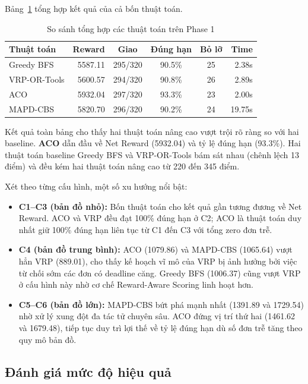 \documentclass[conference]{IEEEtran}
\begin{document}
Bảng~\ref{tab:compare-all} tổng hợp kết quả của cả bốn thuật toán.

\begin{table}[htbp]
\caption{So sánh tổng hợp các thuật toán trên Phase 1}
\label{tab:compare-all}
\centering
\footnotesize
\begin{tabular}{|l|r|c|c|c|r|}
\hline
\textbf{Thuật toán} & \textbf{Reward} & \textbf{Giao} & \textbf{Đúng hạn} & \textbf{Bỏ lỡ} & \textbf{Time} \\
\hline
Greedy BFS   & 5587.11 & 295/320 & 90.5\% & 25 &  2.38s \\
VRP-OR-Tools & 5600.57 & 294/320 & 90.8\% & 26 &  2.89s \\
ACO          & 5932.04 & 297/320 & 93.3\% & 23 &  2.00s \\
MAPD-CBS     & 5820.70 & 296/320 & 90.2\% & 24 & 19.75s \\
\hline
\end{tabular}
\end{table}

Kết quả toàn bảng cho thấy hai thuật toán nâng cao vượt trội rõ ràng so với hai baseline. \textbf{ACO} dẫn đầu về Net Reward (5932.04) và tỷ lệ đúng hạn (93.3\%). Hai thuật toán baseline Greedy BFS và VRP-OR-Tools bám sát nhau (chênh lệch 13 điểm) và đều kém hai thuật toán nâng cao từ 220 đến 345 điểm.

Xét theo từng cấu hình, một số xu hướng nổi bật:
\begin{itemize}
    \item \textbf{C1--C3 (bản đồ nhỏ):} Bốn thuật toán cho kết quả gần tương đương về Net Reward. ACO và VRP đều đạt 100\% đúng hạn ở C2; ACO là thuật toán duy nhất giữ 100\% đúng hạn liên tục từ C1 đến C3 với tổng zero đơn trễ.
    \item \textbf{C4 (bản đồ trung bình):} ACO (1079.86) và MAPD-CBS (1065.64) vượt hẳn VRP (889.01), cho thấy kế hoạch vĩ mô của VRP bị ảnh hưởng bởi việc từ chối sớm các đơn có deadline căng. Greedy BFS (1006.37) cũng vượt VRP ở cấu hình này nhờ cơ chế Reward-Aware Scoring linh hoạt hơn.
    \item \textbf{C5--C6 (bản đồ lớn):} MAPD-CBS bứt phá mạnh nhất (1391.89 và 1729.54) nhờ xử lý xung đột đa tác tử chuyên sâu. ACO đứng vị trí thứ hai (1461.62 và 1679.48), tiếp tục duy trì lợi thế về tỷ lệ đúng hạn dù số đơn trễ tăng theo quy mô bản đồ.
\end{itemize}

\subsection{Đánh giá mức độ hiệu quả}
\end{document}
